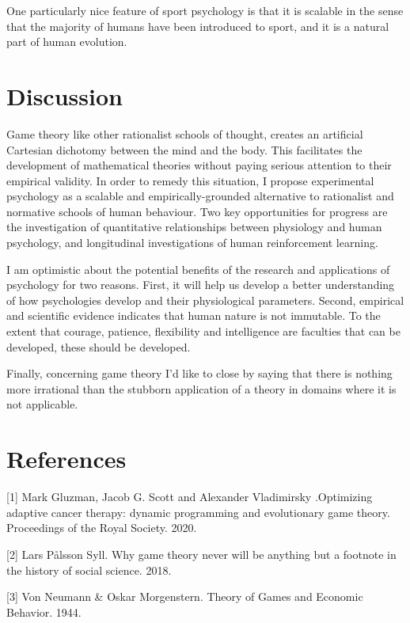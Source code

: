 \documentclass{article}
\begin{document}
One particularly nice feature of sport psychology is that it is scalable in the sense that the majority of humans have been introduced to sport, and it is 
a natural part of human evolution. 

\newpage

\section{Discussion}

Game theory like other rationalist schools of thought, creates an artificial Cartesian dichotomy between the mind and the body. This facilitates the development of mathematical theories without paying serious attention to their empirical validity. In order to remedy this situation, I propose 
experimental psychology as a scalable and empirically-grounded alternative 
to rationalist and normative schools of human behaviour. Two key opportunities
for progress are the investigation of quantitative relationships between physiology and human psychology, and longitudinal investigations of human reinforcement learning. 

I am optimistic about the potential benefits of the research and applications of 
psychology for two reasons. First, it will help us develop a better understanding
of how psychologies develop and their physiological parameters. Second, empirical and scientific evidence indicates that human nature is not immutable. To the extent that courage, patience, flexibility and intelligence are faculties that can be developed, these should be developed. 

Finally, concerning game theory I'd like to close by saying that there is nothing more irrational than the stubborn application of a theory in domains where it is not applicable.  

\section*{References}

\small

[1] Mark Gluzman, Jacob G. Scott and Alexander Vladimirsky .Optimizing adaptive cancer therapy: dynamic programming and evolutionary game theory. Proceedings of the Royal Society. 2020.

[2] Lars Pålsson Syll. Why game theory never will be anything but a footnote in the history of social science. 2018.

[3] Von Neumann & Oskar Morgenstern. Theory of Games and Economic Behavior. 1944.
\end{document}
